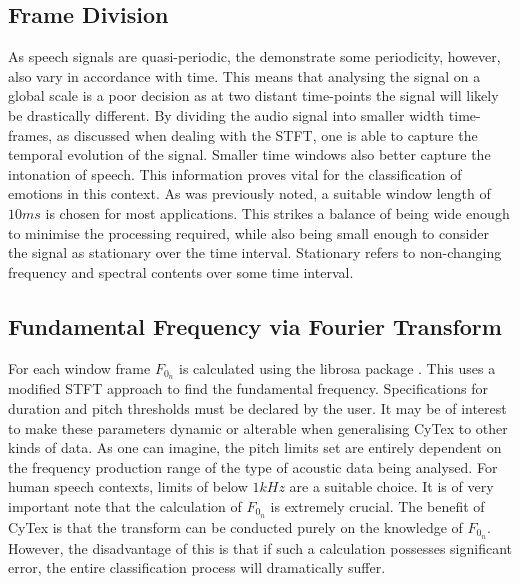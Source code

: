 \subsection{Frame Division}
As speech signals are quasi-periodic, the demonstrate some periodicity, however, also vary in accordance with time. This means that analysing the signal on a global scale is a poor decision as at two distant time-points the signal will likely be drastically different. By dividing the audio signal into smaller width time-frames, as discussed when dealing with the STFT, one is able to capture the temporal evolution of the signal. Smaller time windows also better capture the intonation of speech. This information proves vital for the classification of emotions in this context. As was previously noted, a suitable window length of $10ms$ is chosen for most applications. This strikes a balance of being wide enough to minimise the processing required, while also being small enough to consider the signal as stationary over the time interval. Stationary refers to non-changing frequency and spectral contents over some time interval.

\subsection{Fundamental Frequency via Fourier Transform}
For each window frame $F_{0_n}$ is calculated using the librosa package \cite{mcfee2015librosa}. This uses a modified STFT approach to find the fundamental frequency. Specifications for duration and pitch thresholds must be declared by the user. It may be of interest to make these parameters dynamic or alterable when generalising CyTex to other kinds of data. As one can imagine, the pitch limits set are entirely dependent on the frequency production range of the type of acoustic data being analysed. For human speech contexts, limits of below $1kHz$ are a suitable choice. It is of very important note that the calculation of $F_{0_n}$ is extremely crucial. The benefit of CyTex is that the transform can be conducted purely on the knowledge of $F_{0_n}$. However, the disadvantage of this is that if such a calculation possesses significant error, the entire classification process will dramatically suffer. 

